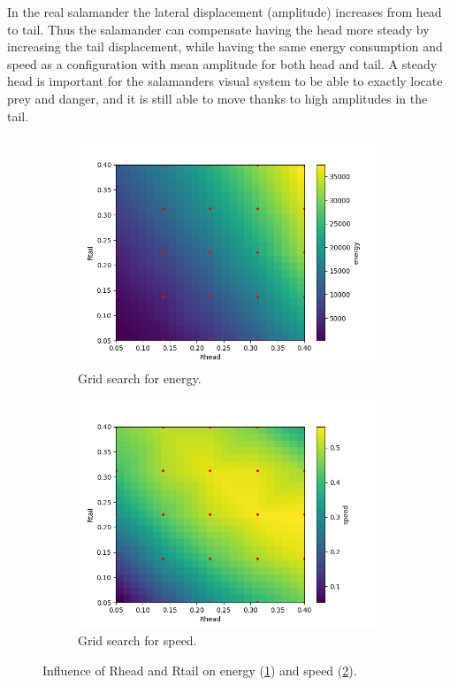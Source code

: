 \documentclass{cmc}
\begin{document}
In the real salamander the lateral displacement (amplitude) increases from head to tail. Thus the salamander can compensate having the head more steady by increasing the tail displacement, while having the same energy consumption and speed as a configuration with mean amplitude for both head and tail. 
A steady head is important for the salamanders visual system to be able to exactly locate prey and danger, and it is still able to move thanks to high amplitudes in the tail.


\begin{figure}[!ht]
  \begin{subfigure}[b]{0.48\textwidth}
    \includegraphics[width=\textwidth]{figures/9c/9c_energy.png}
    \caption{Grid search for energy.}
    \label{fig:9c_energy}
  \end{subfigure}
  \begin{subfigure}[b]{0.48\textwidth}
    \includegraphics[width=\textwidth]{figures/9c/9c_speed.png}
    \caption{Grid search for speed.}
    \label{fig:9c_speed}
  \end{subfigure}
  \caption{Influence of Rhead and Rtail on energy (\ref{fig:9c_energy}) and speed (\ref{fig:9c_speed}).}
  \label{fig:9c}
\end{figure}
\end{document}
